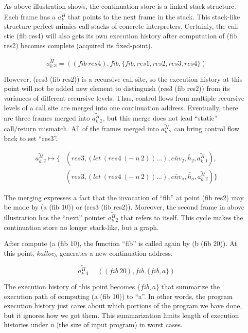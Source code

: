 \documentclass{article}
\begin{document}
As above illustration shows, the continuation store is a linked stack structure. Each frame has a $\widetilde{a^H_k}$ that points to the next frame in the stack. This stack-like structure perfect mimics call stacks of concrete interpreters. Certainly, the call stie (fib res4) will also gets its own execution history after computation of (fib res2) becomes complete (acquired its fixed-point).

\[
\widetilde{a^H_k{}_3} = ((fib\ res4), fib, \{fib, res1, res2, res3, res4\})
\]

However, (res3 (fib res2)) is a recursive call site, so the execution history at this point will not be added new element to distinguish (res3 (fib res2)) from its variances of different recursive levels. Thus, control flows from multiple recursive levels of a call site are merged into one continuation address. Eventually, there are three frames merged into $\widetilde{a^H_k{}_2}$, but this merge does not lead ``static'' call/return mismatch. All of the frames merged into $\widetilde{a^H_k{}_2}$ can bring control flow back to set ``res3''.

\[
\begin{aligned}
\label{eq:show-stack}
\widetilde{a^H_k{}_2} \mapsto \{ {}& (res3, (let\ (res4\ (-\ n\ 2)) \dots), \widetilde{env_2}, \tilde{h_2}, \widetilde{a^H_k{}_1}), {} \\
                                 {}& (res3, (let\ (res4\ (-\ n\ 2)) \dots), \widetilde{env_a}, \tilde{h_a}, \widetilde{a^H_k{}_2}) \}
\end{aligned}
\]

The merging expresses a fact that the invocation of ``fib'' at point (fib res2) may be made by (a (fib 10)) or (res3 (fib res2)). Moreover, the second frame in above illustration has the ``next'' pointer $\widetilde{a^H_k{}_2}$ that refers to itself. This cycle makes the continuation store no longer stack-like, but a graph.

After compute (a (fib 10), the function ``fib'' is called again by (b (fib 20)). At this point, $\widetilde{kalloc_h}$ generates a new continuation address.

\[
\widetilde{a^H_k{}_4} = ((fib\ 20), fib, \{fib, a\})
\]

The execution history of this point becomes $\{fib, a\}$ that summarize the execution path of computing (a (fib 10)) to ``a''. In other words, the program execution history just cares about which portions of the program we have done, but it ignores how we got them. This summarization limits length of execution histories under \textit{n} (the size of input program) in worst cases.
\end{document}
